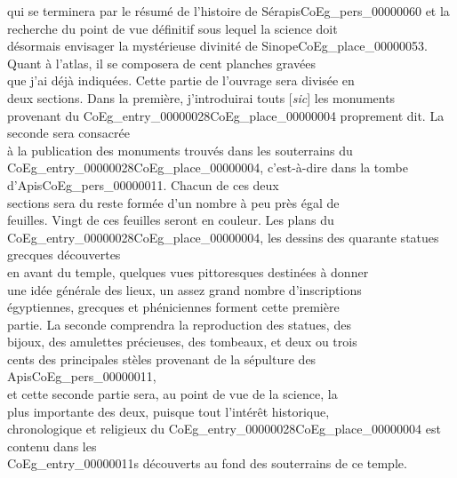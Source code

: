 \documentclass{book}
\begin{document}
qui se terminera par le résumé de l’histoire de Sérapis\gls{CoEg_pers_00000060} et la\\
recherche du point de vue définitif sous lequel la science doit\\
désormais envisager la mystérieuse divinité de Sinope\gls{CoEg_place_00000053}.\\
\indent Quant à l’atlas, il se composera de cent planches gravées\\
que j’ai déjà indiquées. Cette partie de l’ouvrage sera divisée en\\
deux sections. Dans la première, j’introduirai touts [\textit{sic}] les monuments\\
provenant du \Gls{CoEg_entry_00000028}\gls{CoEg_place_00000004} proprement dit. La seconde sera consacrée\\
à la publication des monuments trouvés dans les souterrains du\\
\Gls{CoEg_entry_00000028}\gls{CoEg_place_00000004}, c’est-à-dire dans la tombe d’Apis\gls{CoEg_pers_00000011}. Chacun de ces deux\\
sections sera du reste formée d’un nombre à peu près égal de\\
feuilles. Vingt de ces feuilles seront en couleur. Les plans du\\
\Gls{CoEg_entry_00000028}\gls{CoEg_place_00000004}, les dessins des quarante statues grecques découvertes\\
en avant du temple, quelques vues pittoresques destinées à donner\\
une idée générale des lieux, un assez grand nombre d’inscriptions\\
égyptiennes, grecques et phéniciennes forment cette première\\
partie. La seconde comprendra la reproduction des statues, des\\
bijoux, des amulettes précieuses, des tombeaux, et deux ou trois\\
cents des principales stèles provenant de la sépulture des Apis\gls{CoEg_pers_00000011},\\
et cette seconde partie sera, au point de vue de la science, la\\
plus importante des deux, puisque tout l’intérêt historique,\\
chronologique et religieux du \Gls{CoEg_entry_00000028}\gls{CoEg_place_00000004} est contenu dans les\\
\glspl{CoEg_entry_00000011} découverts au fond des souterrains de ce temple.\\
\end{document}
